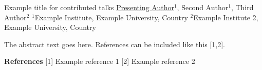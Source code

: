 \begin{abstract_talk}
    {%
        Example title for contributed talks
    }{%
        \underline{Presenting Author}$^1$, Second Author$^1$, Third Author$^2$
    }{%
        $^1$Example Institute, Example University, Country\newline{}
        $^2$Example Institute 2, Example University, Country\newline{}
    }{%
        \CTtag
    }

    The abstract text goes here.
    References can be included like this [1,2].

    \textbf{References} \newline{}
    [1] Example reference 1\newline{}
    [2] Example reference 2\newline{}

\end{abstract_talk}
    
